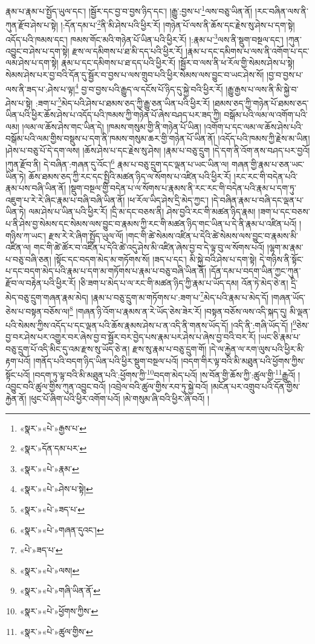 རྣམ་པ་རྣམ་པ་སྤྱོད་ཡུལ་དང་། །སྦྱོར་དང་བྱ་བ་བྱས་ཉིད་དང་། །རྒྱུ་:བྱས་པ་\footnote{«སྣར་»«པེ་»རྒྱས་པ་}ལས་བཅུ་ཡིན་ནོ། །རང་བཞིན་ལས་ནི་ཀུན་རྫོབ་ཤེས་པ་སྟེ། །:དོན་དམ་པ་\footnote{«སྣར་»དོན་དམ་པར་}ནི་མི་ཤེས་པའི་ཕྱིར་རོ། །གཉེན་པོ་ལས་ནི་ཆོས་དང་རྗེས་སུ་ཤེས་པ་དག་སྟེ། འདོད་པའི་ཁམས་དང་། ཁམས་གོང་མའི་གཉེན་པོ་ཡིན་པའི་ཕྱིར་རོ། །:རྣམ་པ་\footnote{«སྣར་»«པེ་»རྣམ་}ལས་ནི་སྡུག་བསྔལ་དང་། །ཀུན་འབྱུང་བ་ཤེས་པ་དག་སྟེ། རྫས་ལ་དམིགས་པ་ཐ་མི་དད་པའི་ཕྱིར་རོ། །རྣམ་པ་དང་དམིགས་པ་ལས་ནི་འགོག་པ་དང་ལམ་ཤེས་པ་དག་སྟེ། རྣམ་པ་དང་དམིགས་པ་ཐ་དད་པའི་ཕྱིར་རོ། །སྦྱོར་བ་ལས་ནི་ཕ་རོལ་གྱི་སེམས་ཤེས་པ་སྟེ། སེམས་ཤེས་པར་བྱ་བའི་དོན་དུ་སྦྱོར་བ་བྱས་པ་ལས་གྲུབ་པའི་ཕྱིར་སེམས་ལས་བྱུང་བ་ཡང་ཤེས་སོ། །བྱ་བ་བྱས་པ་ལས་ནི་ཟད་པ་:ཤེས་པ་ལྟ།\footnote{«སྣར་»«པེ་»ཤེས་པ་སྟེ།} བྱ་བ་བྱས་པའི་རྒྱུད་ལ་དངོས་པོ་ཉིད་དུ་སྐྱེ་བའི་ཕྱིར་རོ། །རྒྱུ་རྒྱས་པ་ལས་ནི་མི་སྐྱེ་བ་ཤེས་པ་སྟེ། :ཟག་པ་\footnote{«སྣར་»«པེ་»ཟད་པ་}མེད་པའི་ཤེས་པ་ཐམས་ཅད་ཀྱི་རྒྱུ་ཅན་ཡིན་པའི་ཕྱིར་རོ། །ཐམས་ཅད་ཀྱི་གཉེན་པོ་ཐམས་ཅད་ཡིན་པའི་ཕྱིར་ཆོས་ཤེས་པ་འདོད་པའི་ཁམས་ཀྱི་གཉེན་པོ་ཞེས་བཤད་པར་ཟད་ཀྱི། བསྒོམ་པའི་ལམ་ལ་འགོག་པའི་ལམ། །ལམ་ལ་ཆོས་ཤེས་གང་ཡིན་དེ། །ཁམས་གསུམ་གྱི་ནི་གཉེན་པོ་ཡིན། །འགོག་པ་དང་ལམ་ལ་ཆོས་ཤེས་པའི་བསྒོམ་པའི་ལམ་གྱིས་བསྡུས་པ་དག་ནི་ཁམས་གསུམ་ཆར་གྱི་གཉེན་པོ་ཡིན་ནོ། །འདོད་པའི་ཁམས་ཀྱི་རྗེས་མ་ཡིན། །ཤེས་པ་བཅུ་པོ་དེ་དག་ལས། །ཆོས་ཤེས་པ་དང་རྗེས་སུ་ཤེས། །རྣམ་པ་བཅུ་དྲུག །དེ་དག་ནི་འོག་ནས་བཤད་པར་བྱའོ། །ཀུན་རྫོབ་ནི། དེ་བཞིན་:གཞན་དུ་འོང་།\footnote{«སྣར་»«པེ་»གཞན་དུའང་།} རྣམ་པ་བཅུ་དྲུག་དང་ལྡན་པ་ཡང་ཡིན་ལ། གཞན་གྱི་རྣམ་པ་ཅན་ཡང་ཡིན་ཏེ། ཆོས་ཐམས་ཅད་ཀྱི་རང་དང་སྤྱིའི་མཚན་ཉིད་ལ་སོགས་པ་འཛིན་པའི་ཕྱིར་རོ། །རང་རང་གི་བདེན་པའི་རྣམ་པས་བཞི་ཡིན་ནོ། །སྡུག་བསྔལ་གྱི་བདེན་པ་ལ་སོགས་པ་རྣམས་ནི་རང་རང་གི་བདེན་པའི་རྣམ་པ་དག་ཏུ་འཇུག་པ་རེ་རེ་ཞིང་རྣམ་པ་བཞི་བཞི་ཡིན་ནོ། །ཕ་རོལ་ཡིད་ཤེས་དྲི་མེད་ཀྱང་། །དེ་བཞིན་རྣམ་པ་བཞི་དང་ལྡན་པ་ཡིན་ཏེ། ལམ་ཤེས་པ་ཡིན་པའི་ཕྱིར་རོ། །དྲི་མ་དང་བཅས་ནི། ཤེས་བྱའི་རང་གི་མཚན་ཉིད་རྣམ། །ཟག་པ་དང་བཅས་པ་ནི་ཤེས་བྱ་སེམས་དང་སེམས་ལས་བྱུང་བ་རྣམས་ཀྱི་རང་གི་མཚན་ཉིད་གང་ཡིན་པ་དེ་ནི་རྣམ་པ་འཛིན་པའོ། །གཉིས་ཀ་ཡང་། རྫས་རེ་རེ་ཞིག་སྤྱོད་ཡུལ་ལོ། །གང་གི་ཚེ་སེམས་འཛིན་པ་དེའི་ཚེ་སེམས་ལས་བྱུང་བ་རྣམས་མི་འཛིན་ལ། གང་གི་ཚེ་ཚོར་བ་འཛིན་པ་དེའི་ཚེ་འདུ་ཤེས་མི་འཛིན་ཞེས་བྱ་བ་དེ་ལྟ་བུ་ལ་སོགས་པའོ། །ལྷག་མ་རྣམ་པ་བཅུ་བཞི་ཅན། །སྟོང་དང་བདག་མེད་མ་གཏོགས་སོ། །ཟད་པ་དང་། མི་སྐྱེ་བའི་ཤེས་པ་དག་སྟེ། དེ་གཉིས་ནི་སྟོང་པ་དང་བདག་མེད་པའི་རྣམ་པ་དག་མ་གཏོགས་པ་རྣམ་པ་བཅུ་བཞི་ཡིན་ནོ། །དོན་དམ་པ་བདག་ཡིན་ཀྱང་ཀུན་རྫོབ་ལ་བརྟེན་པའི་ཕྱིར་རོ། །ཅི་ཟག་པ་མེད་པ་ལ་རང་གི་མཚན་ཉིད་ཀྱི་རྣམ་པ་ཡོད་དམ། འོན་ཏེ་མེད་ཅེ་ན། དྲི་མེད་བཅུ་དྲུག་གཞན་རྣམ་མེད། །རྣམ་པ་བཅུ་དྲུག་མ་གཏོགས་པ་:ཟག་པ་\footnote{«པེ་»ཟད་པ་}མེད་པའི་རྣམ་པ་མེད་དོ། །གཞན་ཡོད་ཅེས་པ་བསྟན་བཅོས་ལ།\footnote{«སྣར་»«པེ་»ལས།} །གཞན་ཉི་འོག་པ་རྣམས་ན་རེ་ཡོད་ཅེས་ཟེར་རོ། །བསྟན་བཅོས་ལས་འདི་སྐད་དུ། མི་ལྡན་པའི་སེམས་ཀྱིས་འདོད་པ་དང་ལྡན་པའི་ཆོས་རྣམས་ཤེས་པ་ན་འདི་ནི་གནས་ཡོད་དོ། །འདི་ནི་:གཞི་ཡོད་དོ། །\footnote{«སྣར་»«པེ་»གཞི་ཡིན་ནོ་}ཅེས་བྱ་བར་ཤེས་པར་འགྱུར་བར་ཞེས་བྱ་བ་སྦྱོར་བར་བྱེད་པས་རྣམ་པར་ཤེས་པ་ཞེས་བྱ་བའི་བར་རོ། །ཡང་ཅི་རྣམ་པ་བཅུ་དྲུག་པོ་འདི་མིང་དུ་འམ་རྫས་སུ་ཡོད་ཅེ་ན། རྫས་སུ་རྣམ་པ་བཅུ་དྲུག་གོ། །དེ་ལ་རྐྱེན་ལ་རག་ལུས་པའི་ཕྱིར་མི་རྟག་པའོ། །གནོད་པའི་བདག་ཉིད་ཡིན་པའི་ཕྱིར་སྡུག་བསྔལ་པའོ། །བདག་གིར་ལྟ་བའི་མི་མཐུན་པའི་ཕྱོགས་ཀྱིས་སྟོང་པའོ། །བདག་ཏུ་ལྟ་བའི་མི་མཐུན་པའི་:ཕྱོགས་ཀྱི་\footnote{«སྣར་»«པེ་»ཕྱོགས་ཀྱིས་}བདག་མེད་པའོ། །ས་བོན་གྱི་ཆོས་ཀྱི་:ཚུལ་གྱི་\footnote{«སྣར་»«པེ་»ཚུལ་གྱིས་}རྒྱུའོ། །འབྱུང་བའི་ཚུལ་གྱིས་ཀུན་འབྱུང་བའོ། །འབྲེལ་བའི་ཚུལ་གྱིས་རབ་ཏུ་སྐྱེ་བའོ། །མངོན་པར་འགྲུབ་པའི་དོན་གྱིས་རྐྱེན་ནོ། །ཕུང་པོ་ཞིག་པའི་ཕྱིར་འགོག་པའོ། །མེ་གསུམ་ཞི་བའི་ཕྱིར་ཞི་བའོ། །

